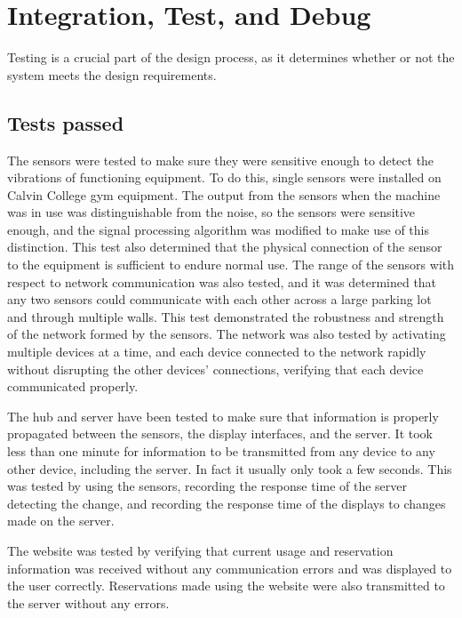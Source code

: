 \documentclass[PPFS.tex]{template/subfiles}
\begin{document}
\section{Integration, Test, and Debug}
Testing is a crucial part of the design process, as it determines whether or not the system meets the design requirements.

\subsection{Tests passed}
The sensors were tested to make sure they were sensitive enough to detect the vibrations of functioning equipment.  To do this, single sensors were installed on Calvin College gym equipment. The output from the sensors when the machine was in use was distinguishable from the noise, so the sensors were sensitive enough, and the signal processing algorithm was modified to make use of this distinction. This test also determined that the physical connection of the sensor to the equipment is sufficient to endure normal use. The range of the sensors with respect to network communication was also tested, and it was determined that any two sensors could communicate with each other across a large parking lot and through multiple walls. This test demonstrated the robustness and strength of the network formed by the sensors. The network was also tested by activating multiple devices at a time, and each device connected to the network rapidly without disrupting the other devices' connections, verifying that each device communicated properly.

The hub and server have been tested to make sure that information is properly propagated between the sensors, the display interfaces, and the server. It took less than one minute for information to be transmitted from any device to any other device, including the server. In fact it usually only took a few seconds. This was tested by using the sensors, recording the response time of the server detecting the change, and recording the response time of the displays to changes made on the server.

The website was tested by verifying that current usage and reservation information was received without any communication errors and was displayed to the user correctly. Reservations made using the website were also transmitted to the server without any errors.
\end{document}
